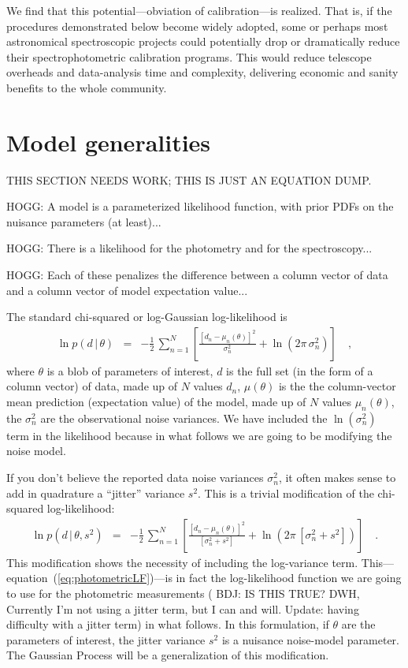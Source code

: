 \documentclass[iop,numberedappendix]{emulateapj}
\newcommand{\given}{\,|\,}
\begin{document}
We find that this potential---obviation of calibration---is realized.
That is, if the procedures demonstrated below become widely adopted,
some or perhaps most astronomical spectroscopic projects could
potentially drop or dramatically reduce their spectrophotometric
calibration programs.
This would reduce telescope overheads and data-analysis time and
complexity, delivering economic and sanity benefits to the whole
community.

\section{Model generalities}

THIS SECTION NEEDS WORK; THIS IS JUST AN EQUATION DUMP.

HOGG: A model is a parameterized likelihood function, with prior PDFs on the nuisance parameters (at least)...

HOGG: There is a likelihood for the photometry and for the spectroscopy...

HOGG: Each of these penalizes the difference between a column vector of data and a column vector of model expectation value...

The standard chi-squared or log-Gaussian log-likelihood is
\begin{eqnarray}
\ln p(d\given\theta) &=& -\frac{1}{2}\,\sum_{n=1}^N \left[\frac{[d_n - \mu_n(\theta)]^2}{\sigma_n^2} + \ln(2\pi\,\sigma_n^2) \right]
\quad ,
\end{eqnarray}
where $\theta$ is a blob of parameters of interest,
$d$ is the full set (in the form of a column vector) of data,
made up of $N$ values $d_n$,
$\mu(\theta)$ is the the column-vector mean prediction (expectation value) of the model,
made up of $N$ values $\mu_n(\theta)$,
the $\sigma_n^2$ are the observational noise variances.
We have included the $\ln(\sigma_n^2)$ term in the likelihood because
in what follows we are going to be modifying the noise model.

If you don't believe the reported data noise variances $\sigma_n^2$,
it often makes sense to add in quadrature a ``jitter'' variance $s^2$.
This is a trivial modification of the chi-squared log-likelihood:
\begin{eqnarray}\label{eq:photometricLF}
\ln p(d\given\theta,s^2) &=& -\frac{1}{2}\,\sum_{n=1}^N \left[\frac{[d_n - \mu_n(\theta)]^2}{[\sigma_n^2 + s^2]} + \ln(2\pi\,[\sigma_n^2 + s^2]) \right]
\quad .
\end{eqnarray}
This modification shows the necessity of including the log-variance
term.
This---equation~(\ref{eq:photometricLF})---is in fact the
log-likelihood function we are going to use for the photometric
measurements ({\color{blue} BDJ: IS THIS TRUE?} {\color{red} DWH,
Currently I'm not using a jitter term, but I can and will.  Update:
having difficulty with a jitter term}) in what follows.  In this
formulation, if $\theta$ are the parameters of interest, the jitter
variance $s^2$ is a nuisance noise-model parameter.  The Gaussian
Process will be a generalization of this modification.
\end{document}
